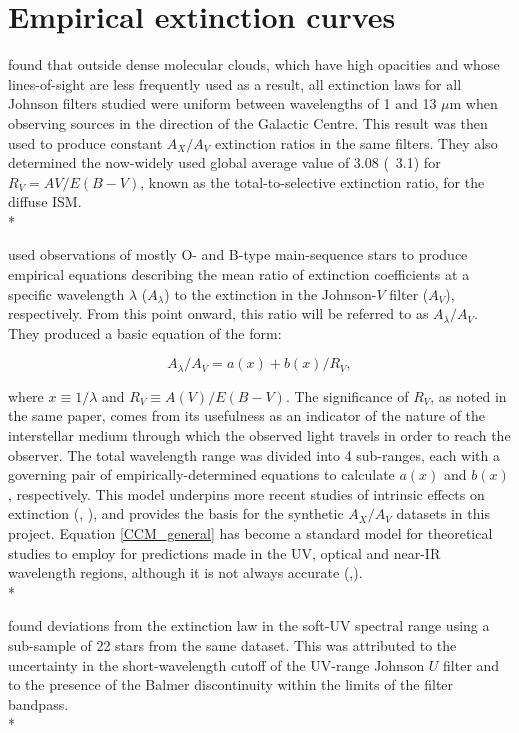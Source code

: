 \documentclass[12pt, a4paper]{report}
\begin{document}
\section{Empirical extinction curves}
\cite{1985ApJ...288..618R} found that outside dense molecular clouds, which have high opacities and whose lines-of-sight are less frequently used as a result, all extinction laws for all Johnson filters studied were uniform between wavelengths of 1 and 13 $\mu$m when observing sources in the direction of the Galactic Centre. This result was then used to produce constant $A_{X}/A_{V}$ extinction ratios in the same filters. They also determined the now-widely used global average value of 3.08 (~3.1) for $R_{V} = A{V}/E(B-V)$, known as the total-to-selective extinction ratio,  for the diffuse ISM. \\*

\cite{1989ApJ...345..245C} used observations of mostly O- and B-type main-sequence stars to produce empirical equations describing the mean ratio of extinction coefficients at a specific wavelength $\lambda$ ($A_{\lambda}$) to the extinction in the Johnson-$V$ filter ($A_{V}$), respectively. From this point onward, this ratio will be referred to as $A_{\lambda}/A_{V}$. They produced a basic equation of the form:

\begin{equation}
A_{\lambda}/A_{V} = a(x) + b(x)/R_{V},
\label{CCM_general}
\end{equation}

where $x \equiv 1/\lambda$ and $R_{V} \equiv A(V)/E(B-V)$. The significance of $R_{V}$, as noted in the same paper, comes from its usefulness as an indicator of the nature of the interstellar medium through which the observed light travels in order to reach the observer. The total wavelength range was divided into 4 sub-ranges, each with a governing pair of empirically-determined equations to calculate $a(x)$ and $b(x)$, respectively. This model underpins more recent studies of intrinsic effects on extinction (\cite{2008PASP..120..583G}, \cite{2018MNRAS.479L.102C}), and provides the basis for the synthetic $A_{X}/A_{V}$ datasets in this project. Equation \ref{CCM_general} has become a standard model for theoretical studies to employ for predictions made in the UV, optical and near-IR wavelength regions, although it is not always accurate (\cite{1994ApJ...422..158O},\cite{1999PASP..111...63F}). \\*

\cite{1994ApJ...422..158O} found deviations from the \cite{1985ApJ...288..618R} extinction law in the soft-UV spectral range using a sub-sample of 22 stars from the same dataset. This was attributed to the uncertainty in the short-wavelength cutoff of the UV-range Johnson $U$ filter and to the presence of the Balmer discontinuity within the limits of the filter bandpass.\\*
\end{document}
